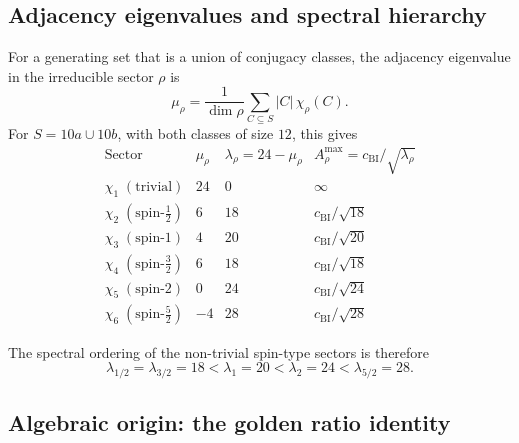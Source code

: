 \documentclass[11pt,a4paper]{article}
\begin{document}
  \subsection{Adjacency eigenvalues and spectral hierarchy}
    \label{sec:step5-spectrum}

    For a generating set that is a union of conjugacy classes, the adjacency
    eigenvalue in the irreducible sector $\rho$ is
    \begin{equation}
      \mu_\rho
      = \frac{1}{\dim\rho}
      \sum_{C \subseteq S} |C|\,\chi_\rho(C).
      \label{eq:mu-formula-2I}
    \end{equation}
    For $S = 10a \cup 10b$, with both classes of size $12$, this gives
    \begin{equation}
      \renewcommand{\arraystretch}{1.4}
      \begin{array}{l|ccc}
        \text{Sector} &
        \mu_\rho &
        \lambda_\rho = 24 - \mu_\rho &
        A^{\max}_\rho = c_{\mathrm{BI}}/\sqrt{\lambda_\rho} \\
        \hline
        \chi_1\;(\text{trivial}) & 24 & 0  & \infty \\
        \chi_2\;(\text{spin-}{\tfrac{1}{2}}) & 6  & 18 & c_{\mathrm{BI}}/\sqrt{18} \\
        \chi_3\;(\text{spin-}1) & 4  & 20 & c_{\mathrm{BI}}/\sqrt{20} \\
        \chi_4\;(\text{spin-}{\tfrac{3}{2}}) & 6  & 18 & c_{\mathrm{BI}}/\sqrt{18} \\
        \chi_5\;(\text{spin-}2) & 0  & 24 & c_{\mathrm{BI}}/\sqrt{24} \\
        \chi_6\;(\text{spin-}{\tfrac{5}{2}}) & -4 & 28 & c_{\mathrm{BI}}/\sqrt{28}
      \end{array}
      \label{eq:2I-spectrum}
    \end{equation}

    The spectral ordering of the non-trivial spin-type sectors is therefore
    \begin{equation}
      \lambda_{1/2} = \lambda_{3/2} = 18
      < \lambda_1 = 20
      < \lambda_2 = 24
      < \lambda_{5/2} = 28.
      \label{eq:2I-ordering}
    \end{equation}

  \subsection{Algebraic origin: the golden ratio identity}
    \label{sec:step5-golden}
\end{document}
